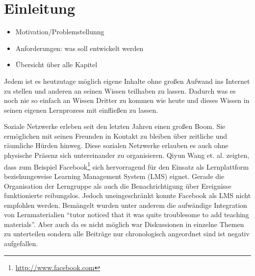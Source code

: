 
\chapter{Einleitung} %
\label{cha:einleitung}

\begin{itemize}
    \item Motivation/Problemstellunng
    \item Anforderungen: was soll entwickelt werden
    \item Übersicht über alle Kapitel
\end{itemize}


Jedem ist es heutzutage möglich eigene Inhalte ohne großen Aufwand ins Internet zu stellen und anderen an seinen Wissen teilhaben zu lassen. Dadurch was es noch nie so einfach an Wissen Dritter zu kommen wie heute und dieses Wissen in seinen eigenen Lernprozess mit einfließen zu lassen. 

Soziale Netzwerke erleben seit den letzten Jahren einen großen Boom. Sie ermöglichen mit seinen Freunden in Kontakt zu bleiben über zeitliche und räumliche Hürden hinweg. Diese sozialen Netzwerke erlauben es auch ohne physische Präsenz sich untereinander zu organisieren. Qiyun Wang et. al. \cite{Wang2012} zeigten, dass zum Beispiel Facebook\footnote{\url{http://www.facebook.com}} sich hervorragend für den Einsatz als Lernplattform beziehungsweise Learning Management System (LMS) eignet. Gerade die Organisation der Lerngruppe als auch die Benachrichtigung über Ereignisse funktionierte reibungslos. Jedoch uneingeschränkt konnte Facebook als LMS nicht empfohlen werden. Bemängelt wurden unter anderem die aufwändige Integration von Lernmaterialien \enquote{tutor noticed that it was quite troublesome to add teaching materials}\cite[S.\,435]{Wang2012}. Aber auch da es nicht möglich war Diskussionen in einzelne Themen zu unterteilen sondern alle Beiträge nur chronologisch angeordnet sind ist negativ aufgefallen. 





